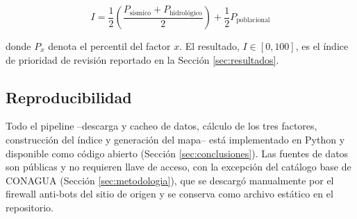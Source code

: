 \begin{equation}
I = \frac{1}{2}\left(\frac{P_{\text{s\'ismico}} + P_{\text{hidrol\'ogico}}}{2}\right) + \frac{1}{2} P_{\text{poblacional}}
\label{eq:indice}
\end{equation}

donde \(P_x\) denota el percentil del factor \(x\). El resultado, $I \in [0, 100]$, es el \'indice de prioridad de revisi\'on reportado en la Secci\'on \ref{sec:resultados}.

\subsection{Reproducibilidad}

Todo el pipeline --descarga y cacheo de datos, c\'alculo de los tres factores, construcci\'on del \'indice y generaci\'on del mapa-- est\'a implementado en Python y disponible como c\'odigo abierto (Secci\'on \ref{sec:conclusiones}). Las fuentes de datos son p\'ublicas y no requieren llave de acceso, con la excepci\'on del cat\'alogo base de CONAGUA (Secci\'on \ref{sec:metodologia}), que se descarg\'o manualmente por el firewall anti-bots del sitio de origen y se conserva como archivo est\'atico en el repositorio.
